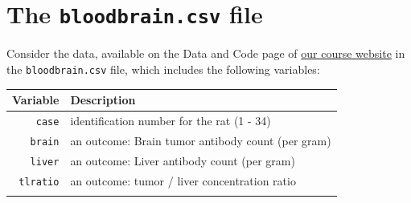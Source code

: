 \documentclass[]{book}
\theoremstyle{definition}
\theoremstyle{definition}
\theoremstyle{definition}
\theoremstyle{remark}
\begin{document}
\section{\texorpdfstring{The \texttt{bloodbrain.csv}
file}{The bloodbrain.csv file}}\label{the-bloodbrain.csv-file}

Consider the data, available on the Data and Code page of
\href{https://github.com/THOMASELOVE/432-2018}{our course website} in
the \texttt{bloodbrain.csv} file, which includes the following
variables:

\begin{longtable}[]{@{}rl@{}}
\toprule
\begin{minipage}[b]{0.12\columnwidth}\raggedleft\strut
Variable\strut
\end{minipage} & \begin{minipage}[b]{0.59\columnwidth}\raggedright\strut
Description\strut
\end{minipage}\tabularnewline
\midrule
\endhead
\begin{minipage}[t]{0.12\columnwidth}\raggedleft\strut
\texttt{case}\strut
\end{minipage} & \begin{minipage}[t]{0.59\columnwidth}\raggedright\strut
identification number for the rat (1 - 34)\strut
\end{minipage}\tabularnewline
\begin{minipage}[t]{0.12\columnwidth}\raggedleft\strut
\texttt{brain}\strut
\end{minipage} & \begin{minipage}[t]{0.59\columnwidth}\raggedright\strut
an outcome: Brain tumor antibody count (per gram)\strut
\end{minipage}\tabularnewline
\begin{minipage}[t]{0.12\columnwidth}\raggedleft\strut
\texttt{liver}\strut
\end{minipage} & \begin{minipage}[t]{0.59\columnwidth}\raggedright\strut
an outcome: Liver antibody count (per gram)\strut
\end{minipage}\tabularnewline
\begin{minipage}[t]{0.12\columnwidth}\raggedleft\strut
\texttt{tlratio}\strut
\end{minipage} & \begin{minipage}[t]{0.59\columnwidth}\raggedright\strut
an outcome: tumor / liver concentration ratio\strut
\end{minipage}\tabularnewline
\begin{minipage}[t]{0.12\columnwidth}\raggedleft\strut

\end{minipage}
\end{longtable}
\end{document}
